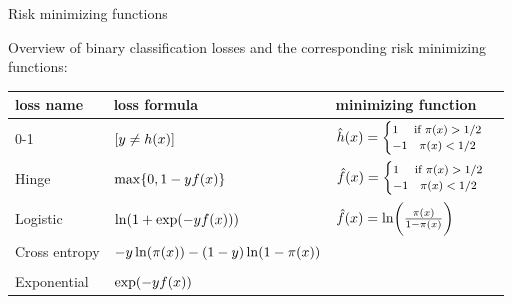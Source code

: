 \begin{vbframe}{Risk minimizing functions}

Overview of binary classification losses and the corresponding risk minimizing functions:

\lz

\begin{tabular}{p{2.5cm}|p{3.5cm}|p{4.5cm}}
  loss name & loss formula  & minimizing function \\
  \hline
  0-1 & $[y \neq h(x)]$ & $\hat{h}(x) = \footnotesize \begin{cases} 1 \quad \text{ if } \pi(x) > 1/2 \\ -1 \quad \pi(x) < 1/2  \end{cases}$ \\
  Hinge & $\max\{0, 1 - y f(x)\}$ & $\hat{f}(x) =  \footnotesize \begin{cases} 1 \quad \text{ if } \pi(x) > 1/2 \\ -1 \quad \pi(x) < 1/2  \end{cases}$ \\
  Logistic & $\ln(1+\exp(-yf(x)))$ & $\hat{f}(x) =  \ln \biggl(\frac{\pi(x)}{1-\pi(x)}\biggr)$ \\
  Cross entropy & $-y\ln(\pix) \newline -(1-y)\ln(1-\pix)$ & \\
  & & \\
  Exponential & $\exp(-yf(x))$ &

\end{tabular}

\end{vbframe}




% 
% 




\endlecture


